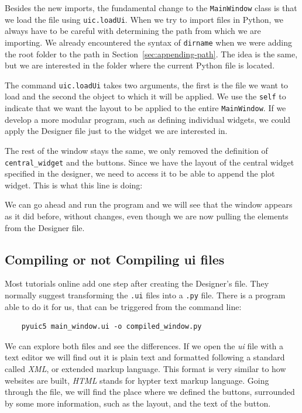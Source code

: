 Besides the new imports, the fundamental change to the \texttt{MainWindow} class is that we load the file using \texttt{uic.loadUi}. When we try to import files in Python, we always have to be careful with determining the path from which we are importing. We already encountered the syntax of \texttt{dirname} when we were adding the root folder to the path in Section~\ref{sec:appending-path}. The idea is the same, but we are interested in the folder where the current Python file is located.

The command \texttt{uic.loadUi} takes two arguments, the first is the file we want to load and the second the object to which it will be applied. We use the \texttt{self} to indicate that we want the layout to be applied to the entire \texttt{MainWindow}. If we develop a more modular program, such as defining individual widgets, we could apply the Designer file just to the widget we are interested in.

The rest of the window stays the same, we only removed the definition of \texttt{central\_widget} and the buttons. Since we have the layout of the central widget specified in the designer, we need to access it to be able to append the plot widget. This is what this line is doing:


We can go ahead and run the program and we will see that the window appears as it did before, without changes, even though we are now pulling the elements from the Designer file.

\subsection{Compiling or not Compiling ui files}\label{subsec:compiling-or-not-compiling-ui-files}
Most tutorials online add one step after creating the Designer's file. They normally suggest transforming the \texttt{.ui} files into a \texttt{.py} file. There is a program able to do it for us, that can be triggered from the command line:

\begin{verbatim}
    pyuic5 main_window.ui -o compiled_window.py
\end{verbatim}

We can explore both files and see the differences. If we open the \emph{ui} file with a text editor we will find out it is plain text and formatted following a standard called \emph{XML}, or extended markup language. This format is very similar to how websites are built, \emph{HTML} stands for hypter text markup language. Going through the file, we will find the place where we defined the buttons, surrounded by some more information, such as the layout, and the text of the button.

